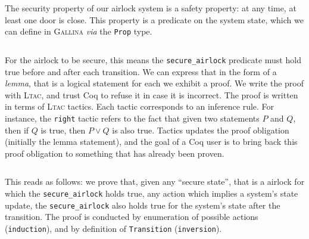 \documentclass[oneside,a4paper]{memoir}
\theoremstyle{break}
\begin{document}
The security property of our airlock system is a safety property: at any time,
at least one door is close.
%
This property is a predicate on the system state, which we can define in
{\scshape Gallina} \emph{via} the \texttt{Prop} type.

\inputminted[firstline=35,lastline=38]{coq}{Listings/Airlock.v}

For the airlock to be secure, this means the \texttt{secure\_airlock} predicate
must hold true before and after each transition.
%
We can express that in the form of a \emph{lemma}, that is a logical statement
for each we exhibit a proof.
%
We write the proof with {\scshape Ltac}, and trust Coq to refuse it in case it
is incorrect.
%
The proof is written in terms of {\scshape Ltac} tactics.
%
Each tactic corresponds to an inference rule.
%
For instance, the \texttt{right} tactic refers to the fact that given two
statements $P$ and $Q$, then if $Q$ is true, then $P \vee Q$ is also
true. Tactics updates the proof obligation (initially the lemma statement), and
the goal of a Coq user is to bring back this proof obligation to something that
has already been proven.

\inputminted[firstline=40,lastline=57]{coq}{Listings/Airlock.v}

This reads as follows: we prove that, given any ``secure state'', that is a
airlock for which the \texttt{secure\_airlock} holds true, any action which
implies a system's state update, the \texttt{secure\_airlock} also holds true
for the system's state after the transition.
%
The proof is conducted by enumeration of possible actions (\texttt{induction}),
and by definition of \texttt{Transition} (\texttt{inversion}).




\end{document}
